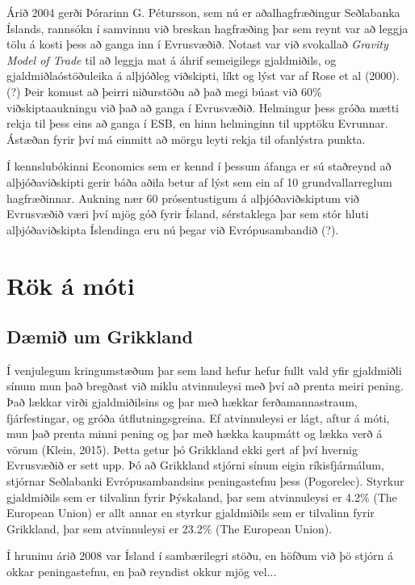 \documentclass[a4paper]{article}
\begin{document}
Árið 2004 gerði Þórarinn G. Pétursson, sem nú er aðalhagfræðingur Seðlabanka Íslands, rannsókn í samvinnu við breskan hagfræðing þar sem reynt var að leggja tölu á kosti þess að ganga inn í Evrusvæðið. Notast var við svokallað \textit{Gravity Model of Trade} til að leggja mat á áhrif semeigilegs gjaldmiðils, og gjaldmiðlaóstöðuleika á alþjóðleg viðskipti, líkt og lýst var af Rose et al (2000).(?) Þeir komust að þeirri niðurstöðu að það megi búast við 60\% viðskiptaaukningu við það að ganga í Evrusvæðið. Helmingur þess gróða mætti rekja til þess eins að ganga í ESB, en hinn helminginn til upptöku Evrunnar. Ástæðan fyrir því má einmitt að mörgu leyti rekja til ofanlýstra punkta.\cite{icb_wp_26}

Í kennslubókinni Economics sem er kennd í þessum áfanga er sú staðreynd að alþjóðaviðskipti gerir báða aðila betur af lýst sem ein af 10 grundvallarreglum hagfræðinnar. Aukning nær 60 prósentustigum á alþjóðaviðskiptum við Evrusvæðið væri því mjög góð fyrir Ísland, sérstaklega þar sem stór hluti alþjóðaviðskipta Íslendinga eru nú þegar við Evrópusambandið (?).

\section{Rök á móti}

\subsection{Dæmið um Grikkland}

Í venjulegum kringumstæðum þar sem land hefur hefur fullt vald yfir gjaldmiðli sínum mun það bregðast við miklu atvinnuleysi með því að prenta meiri pening. Það lækkar virði gjaldmiðilsins og þar með hækkar ferðamannastraum, fjárfestingar, og gróða útflutningsgreina. Ef atvinnuleysi er lágt, aftur á móti, mun það prenta minni pening og þar með hækka kaupmátt og lækka verð á vörum (Klein, 2015). Þetta getur þó Grikkland ekki gert af því hvernig Evrusvæðið er sett upp. Þó að Grikkland stjórni sínum eigin ríkisfjármálum, stjórnar Seðlabanki Evrópusambandsins  peningastefnu þess (Pogorelec). Styrkur gjaldmiðils sem er tilvalinn fyrir Þýskaland, þar sem atvinnuleysi er 4.2\% (The European Union) er allt annar en styrkur gjaldmiðils sem er tilvalinn fyrir Grikkland, þar sem atvinnuleysi er 23.2\% (The European Union).

Í hruninu árið 2008 var Ísland í sambærilegri stöðu, en höfðum við þö stjórn á okkar peningastefnu, en það reyndist okkur mjög vel...



\end{document}
